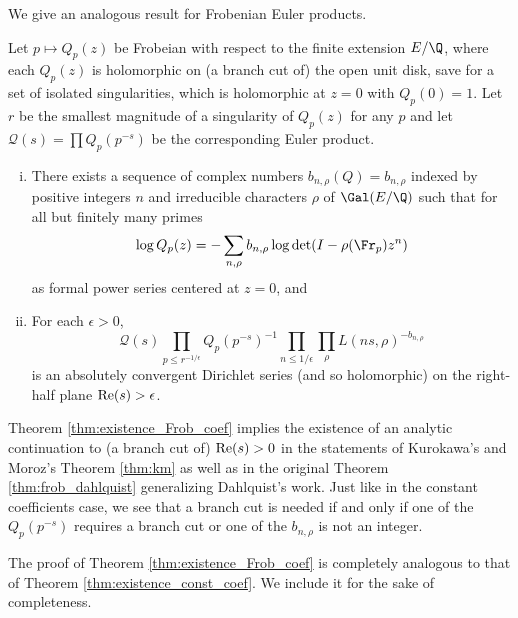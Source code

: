 \documentclass[12pt]{amsart}
\theoremstyle{plain}
\begin{document}
We give an analogous result for Frobenian Euler products.

\begin{theorem}\label{thm:existence_Frob_coef}
    Let $p\mapsto Q_p(z)$ be Frobeian with respect to the finite extension $E/\Q$, where each $Q_p(z)$ is holomorphic on (a branch cut of) the open unit disk, save for a set of isolated singularities, which is holomorphic at $z=0$ with $Q_p(0)=1$. Let $r$ be the smallest magnitude of a singularity of $Q_p(z)$ for any $p$ and let $\mathcal{Q}(s) = \prod Q_p(p^{-s})$ be the corresponding Euler product.
    \begin{enumerate}[(i)]
        \item There exists a sequence of complex numbers $b_{n,\rho}(Q) = b_{n,\rho}$ indexed by positive integers $n$ and irreducible characters $\rho$ of $\Gal(E/\Q)$ such that for all but finitely many primes
        \[
            \log Q_p(z) = -\sum_{n,\rho} b_{n,\rho}\log\det(I-\rho(\Fr_p)z^n)
        \]
        as formal power series centered at $z=0$, and
        \item For each $\epsilon > 0$,
        \[
            \mathcal{Q}(s) \prod_{p\le r^{-1/\epsilon}}Q_p(p^{-s})^{-1}\prod_{n\le 1/\epsilon}\prod_\rho L(ns,\rho)^{-b_{n,\rho}}
        \]
        is an absolutely convergent Dirichlet series (and so holomorphic) on the right-half plane ${\rm Re}(s) > \epsilon$.
    \end{enumerate}
\end{theorem}

Theorem \ref{thm:existence_Frob_coef} implies the existence of an analytic continuation to (a branch cut of) ${\rm Re}(s) > 0$ in the statements of Kurokawa's and Moroz's Theorem \ref{thm:km} as well as in the original Theorem \ref{thm:frob_dahlquist} generalizing Dahlquist's work. Just like in the constant coefficients case, we see that a branch cut is needed if and only if one of the $Q_p(p^{-s})$ requires a branch cut or one of the $b_{n,\rho}$ is not an integer.

The proof of Theorem \ref{thm:existence_Frob_coef} is completely analogous to that of Theorem \ref{thm:existence_const_coef}. We include it for the sake of completeness.
\end{document}
